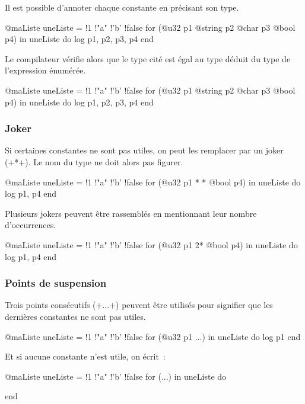 Il est possible d'annoter chaque constante en précisant son type.

\begin{galgas4}
@maListe uneListe = {!1 !"a" !'b' !false}
for (@u32 p1 @string p2 @char p3 @bool p4) in uneListe do
  log p1, p2, p3, p4
end
\end{galgas4}

Le compilateur vérifie alors que le type cité est égal au type déduit du type de l'expression énumérée.
\begin{galgas4}
@maListe uneListe = {!1 !"a" !'b' !false}
for (@u32 p1 @string p2 @char p3 @bool p4) in uneListe do
  log p1, p2, p3, p4
end
\end{galgas4}


\subsubsection{Joker}

Si certaines constantes ne sont pas utiles, on peut les remplacer par un joker (\ggsq+*+). Le nom du type ne doit alors pas figurer.
\begin{galgas4}
@maListe uneListe = {!1 !"a" !'b' !false}
for (@u32 p1 * * @bool p4) in uneListe do
  log p1, p4
end
\end{galgas4}

Plusieurs jokers peuvent être rassemblés en mentionnant leur nombre d'occurrences.
\begin{galgas4}
@maListe uneListe = {!1 !"a" !'b' !false}
for (@u32 p1 2* @bool p4) in uneListe do
  log p1, p4
end
\end{galgas4}



\subsubsection{Points de suspension}

Trois points consécutifs (\ggsq+...+) peuvent être utilisés pour signifier que les dernières constantes ne sont pas utiles.

\begin{galgas4}
@maListe uneListe = {!1 !"a" !'b' !false}
for (@u32 p1 ...) in uneListe do
  log p1
end
\end{galgas4}

Et si aucune constante n'est utile, on écrit~:
\begin{galgas4}
@maListe uneListe = {!1 !"a" !'b' !false}
for (...) in uneListe do

end
\end{galgas4}






